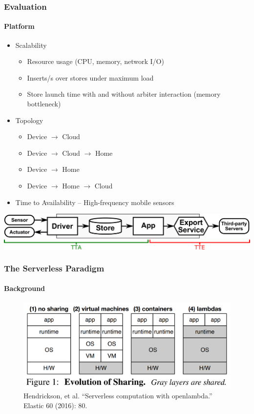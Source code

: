 \documentclass[aspectratio=169]{beamer}
\begin{document}
\begin{frame}
	\frametitle{Evaluation}
	\framesubtitle{Platform}
	\begin{itemize}
		\item Scalability
		\begin{itemize}
			\item Resource usage (CPU, memory, network I/O)
			\item Inserts/s over stores under maximum load
			\item Store launch time with and without arbiter interaction (memory bottleneck)
		\end{itemize}
		\item Topology
		\begin{itemize}
			\item Device $\rightarrow$ Cloud
			\item Device $\rightarrow$ Cloud $\rightarrow$ Home
			\item Device $\rightarrow$ Home
			\item Device $\rightarrow$ Home $\rightarrow$ Cloud
		\end{itemize}
		\item Time to Availability -- High-frequency mobile sensors
	\end{itemize}
	\centering
	\includegraphics[width=0.8\linewidth]{tta-tte.pdf}
\end{frame}

\begin{frame}
	\frametitle{The Serverless Paradigm}
	\framesubtitle{Background}

	\begin{figure}
		\centering
		\includegraphics[width=\linewidth]{openlambda}
		\caption{Hendrickson, et al. ``Serverless computation with openlambda.'' Elastic 60 (2016): 80.}
	\end{figure}
\end{frame}
\end{document}
